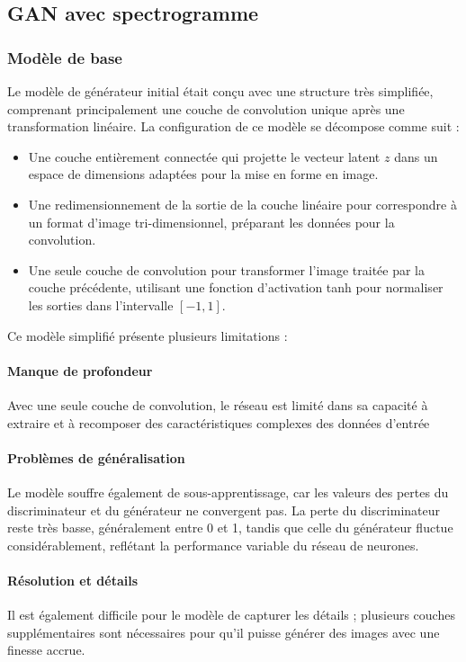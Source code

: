 \subsection{GAN avec spectrogramme}


\subsubsection{Modèle de base}
Le modèle de générateur initial était conçu avec une structure très simplifiée, comprenant principalement une couche de convolution unique après une transformation linéaire. La configuration de ce modèle se décompose comme suit :

\begin{itemize}
    \item Une couche entièrement connectée qui projette le vecteur latent \( z \) dans un espace de dimensions adaptées pour la mise en forme en image.
    \item Une redimensionnement de la sortie de la couche linéaire pour correspondre à un format d'image tri-dimensionnel, préparant les données pour la convolution.
    \item Une seule couche de convolution pour transformer l'image traitée par la couche précédente, utilisant une fonction d'activation tanh pour normaliser les sorties dans l'intervalle \([-1,1]\).
\end{itemize}

Ce modèle simplifié présente plusieurs limitations :

\paragraph{Manque de profondeur}
Avec une seule couche de convolution, le réseau est limité dans sa capacité à extraire et à recomposer des caractéristiques complexes des données d'entrée

\paragraph{Problèmes de généralisation}
Le modèle souffre également de sous-apprentissage, car les valeurs des pertes du discriminateur et du générateur ne convergent pas. La perte du discriminateur reste très basse, généralement entre 0 et 1, tandis que celle du générateur fluctue considérablement, reflétant la performance variable du réseau de neurones.

\paragraph{Résolution et détails}
Il est également difficile pour le modèle de capturer les détails ; plusieurs couches supplémentaires sont nécessaires pour qu'il puisse générer des images avec une finesse accrue.

